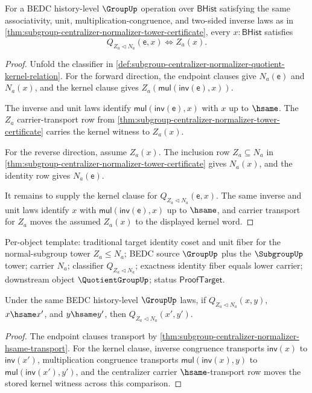 \begin{theorem}
\label{thm:subgroup-centralizer-normalizer-quotient-kernel-identity-fiber}
For a BEDC history-level $\GroupUp$ operation over $\mathsf{BHist}$ satisfying
the same associativity, unit, multiplication-congruence, and two-sided inverse
laws as in
\autoref{thm:subgroup-centralizer-normalizer-tower-certificate}, every
$x:\mathsf{BHist}$ satisfies
$$
Q_{Z_a\triangleleft N_a}(\mathsf{e},x)\Longleftrightarrow Z_a(x).
$$
\end{theorem}
\begin{proof}
Unfold the classifier in
\autoref{def:subgroup-centralizer-normalizer-quotient-kernel-relation}.
For the forward direction, the endpoint clauses give $N_a(\mathsf{e})$ and
$N_a(x)$, and the kernel clause gives
$Z_a(\mathsf{mul}(\mathsf{inv}(\mathsf{e}),x))$.

The inverse and unit laws identify
$\mathsf{mul}(\mathsf{inv}(\mathsf{e}),x)$ with $x$ up to $\hsame$. The
$Z_a$ carrier-transport row from
\autoref{thm:subgroup-centralizer-normalizer-tower-certificate} carries the
kernel witness to $Z_a(x)$.

For the reverse direction, assume $Z_a(x)$. The inclusion row
$Z_a\subseteq N_a$ in
\autoref{thm:subgroup-centralizer-normalizer-tower-certificate} gives
$N_a(x)$, and the identity row gives $N_a(\mathsf{e})$.

It remains to supply the kernel clause for
$Q_{Z_a\triangleleft N_a}(\mathsf{e},x)$. The same inverse and unit laws
identify $x$ with $\mathsf{mul}(\mathsf{inv}(\mathsf{e}),x)$ up to $\hsame$,
and carrier transport for $Z_a$ moves the assumed $Z_a(x)$ to the displayed
kernel word.
\end{proof}

Per-object template: traditional target identity coset and unit fiber for the
normal-subgroup tower $Z_a\leq N_a$; BEDC source $\GroupUp$ plus the
$\SubgroupUp$ tower; carrier $N_a$; classifier $Q_{Z_a\triangleleft N_a}$;
exactness identity fiber equals lower carrier; downstream object
$\QuotientGroupUp$; status $\mathsf{ProofTarget}$.

\begin{theorem}
\label{thm:subgroup-centralizer-quotient-kernel-hsame-transport}
Under the same BEDC history-level $\GroupUp$ laws, if
$Q_{Z_a\triangleleft N_a}(x,y)$, $x\hsame x'$, and $y\hsame y'$, then
$Q_{Z_a\triangleleft N_a}(x',y')$.
\end{theorem}
\begin{proof}
The endpoint clauses transport by
\autoref{thm:subgroup-centralizer-normalizer-hsame-transport}. For the kernel
clause, inverse congruence transports $\mathsf{inv}(x)$ to
$\mathsf{inv}(x')$, multiplication congruence transports
$\mathsf{mul}(\mathsf{inv}(x),y)$ to
$\mathsf{mul}(\mathsf{inv}(x'),y')$, and the centralizer carrier
$\hsame$-transport row moves the stored kernel witness across this comparison.
\end{proof}

